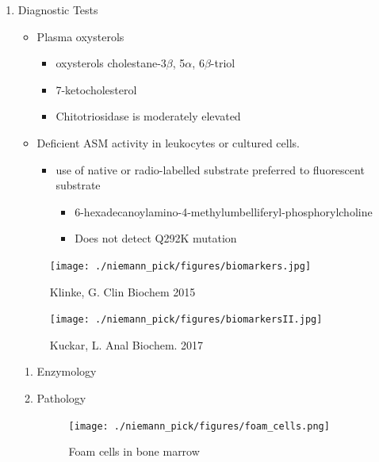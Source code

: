\documentclass{scrartcl}
\begin{document}
\begin{enumerate}
\item Diagnostic Tests
\label{sec:orgcda7eee}
\begin{itemize}
\item Plasma oxysterols
\begin{itemize}
\item oxysterols cholestane-3\(\beta\), 5\(\alpha\), 6\(\beta\)-triol
\item 7-ketocholesterol
\item Chitotriosidase is moderately elevated
\end{itemize}
\item Deficient ASM activity in leukocytes or cultured cells.
\begin{itemize}
\item use of native or radio-labelled substrate preferred to fluorescent substrate
\begin{itemize}
\item 6-hexadecanoylamino-4-methylumbelliferyl-phosphorylcholine
\item Does not detect Q292K mutation
\end{itemize}
\end{itemize}
\end{itemize}

\begin{figure}[htbp]
\centering
\texttt{[image: ./niemann\_pick/figures/biomarkers.jpg]}
\caption{\label{fig:org9cddde6}
Klinke, G. Clin Biochem 2015}
\end{figure}


\begin{figure}[htbp]
\centering
\texttt{[image: ./niemann\_pick/figures/biomarkersII.jpg]}
\caption{\label{fig:org80c4c28}
Kuckar, L. Anal Biochem. 2017}
\end{figure}

\begin{enumerate}
\item Enzymology
\label{sec:orgfa89e7f}


\item Pathology
\label{sec:orgf3c7649}
\begin{figure}[htbp]
\centering
\texttt{[image: ./niemann\_pick/figures/foam\_cells.png]}
\caption{\label{fig:org6542ab6}
Foam cells in bone marrow}
\end{figure}
\end{enumerate}




\end{enumerate}
\end{document}
